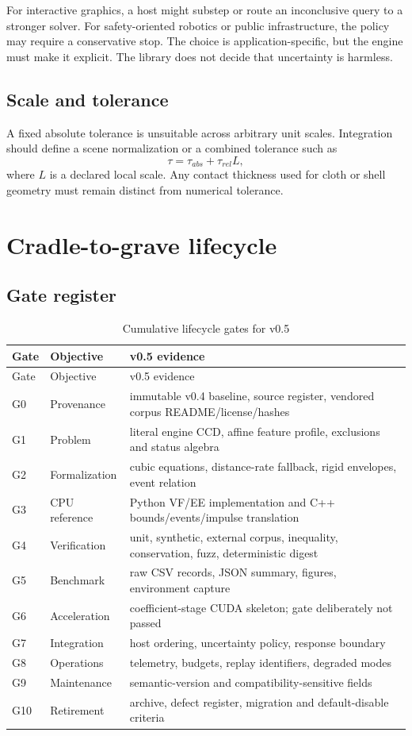 \documentclass[11pt,a4paper,oneside]{book}
\begin{document}
For interactive graphics, a host might substep or route an inconclusive query to a stronger solver. For safety-oriented robotics or public infrastructure, the policy may require a conservative stop. The choice is application-specific, but the engine must make it explicit. The library does not decide that uncertainty is harmless.

\section{Scale and tolerance}

A fixed absolute tolerance is unsuitable across arbitrary unit scales. Integration should define a scene normalization or a combined tolerance such as
\[
  \tau=\tau_{abs}+\tau_{rel}L,
\]
where $L$ is a declared local scale. Any contact thickness used for cloth or shell geometry must remain distinct from numerical tolerance.

\chapter{Cradle-to-grave lifecycle}
\section{Gate register}

\begin{longtable}{p{}p{}p{}}
\caption{Cumulative lifecycle gates for v0.5}\label{tab:gates}\\
\toprule
Gate & Objective & v0.5 evidence\\
\midrule
\endfirsthead
\toprule
Gate & Objective & v0.5 evidence\\
\midrule
\endhead
G0 & Provenance & immutable v0.4 baseline, source register, vendored corpus README/license/hashes\\
G1 & Problem & literal engine CCD, affine feature profile, exclusions and status algebra\\
G2 & Formalization & cubic equations, distance-rate fallback, rigid envelopes, event relation\\
G3 & CPU reference & Python VF/EE implementation and C++ bounds/events/impulse translation\\
G4 & Verification & unit, synthetic, external corpus, inequality, conservation, fuzz, deterministic digest\\
G5 & Benchmark & raw CSV records, JSON summary, figures, environment capture\\
G6 & Acceleration & coefficient-stage CUDA skeleton; gate deliberately not passed\\
G7 & Integration & host ordering, uncertainty policy, response boundary\\
G8 & Operations & telemetry, budgets, replay identifiers, degraded modes\\
G9 & Maintenance & semantic-version and compatibility-sensitive fields\\
G10 & Retirement & archive, defect register, migration and default-disable criteria\\
\bottomrule
\end{longtable}
\end{document}
